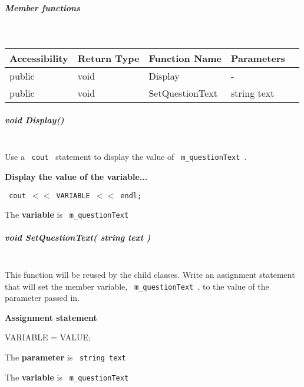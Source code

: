 \documentclass[a4paper,12pt]{book}
\begin{document}
                        \subparagraph{ Member functions } ~\\

                            \begin{tabular}{ l l l l l }
                                Accessibility & Return Type & Function Name & Parameters \\ \hline{}
                                public & void & Display & - \\ \hline{}
                                public & void & SetQuestionText & string text 
                            \end{tabular}

                        \subparagraph{ void Display() } ~\\
                            Use a \texttt{ cout } statement to display
                            the value of \texttt{ m\_questionText }.

                            \begin{mdframed}[backgroundcolor=hint] 
                            \textbf{ Display the value of the variable... }

                            \texttt{ cout $ << $ VARIABLE $ << $ endl; }
                            
                            The \textbf{ variable } is \texttt{ m\_questionText }
                            \end{mdframed}
                            


                        \newpage
                        \subparagraph{ void SetQuestionText( string text ) } ~\\

                            This function will be reused by the child classes.
                            Write an assignment statement that will set the
                            member variable, \texttt{ m\_questionText },
                            to the value of the parameter passed in.
                            
                            \begin{mdframed}[backgroundcolor=hint] 
                            \textbf{ Assignment statement }

                            VARIABLE = VALUE;

                            The \textbf{ parameter } is \texttt{ string text }
                            
                            The \textbf{ variable } is \texttt{ m\_questionText }
                            \end{mdframed}
\end{document}
